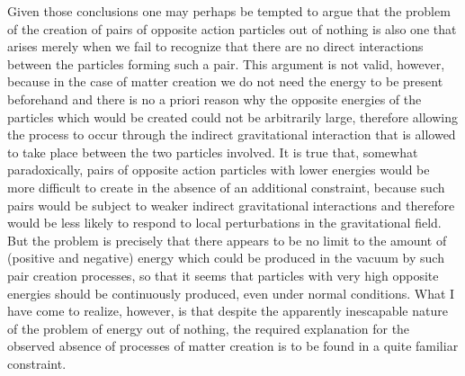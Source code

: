 \documentclass[notitlepage,12pt]{report}
\begin{document}
Given those conclusions one may perhaps be tempted to argue that the problem of the creation of pairs of opposite action particles out of nothing is also one that arises merely when we fail to recognize that there are no direct interactions between the particles forming such a pair. This argument is not valid, however, because in the case of matter creation we do not need the energy to be present beforehand and there is no a priori reason why the opposite energies of the particles which would be created could not be arbitrarily large, therefore allowing the process to occur through the indirect gravitational interaction that is allowed to take place between the two particles involved. It is true that, somewhat paradoxically, pairs of opposite action particles with lower energies would be more difficult to create in the absence of an additional constraint, because such pairs would be subject to weaker indirect gravitational interactions and therefore would be less likely to respond to local perturbations in the gravitational field. But the problem is precisely that there appears to be no limit to the amount of (positive and negative) energy which could be produced in the vacuum by such pair creation processes, so that it seems that particles with very high opposite energies should be continuously produced, even under normal conditions. What I have come to realize, however, is that despite the apparently inescapable nature of the problem of energy out of nothing, the required explanation for the observed absence of processes of matter creation is to be found in a quite familiar constraint.
\end{document}
